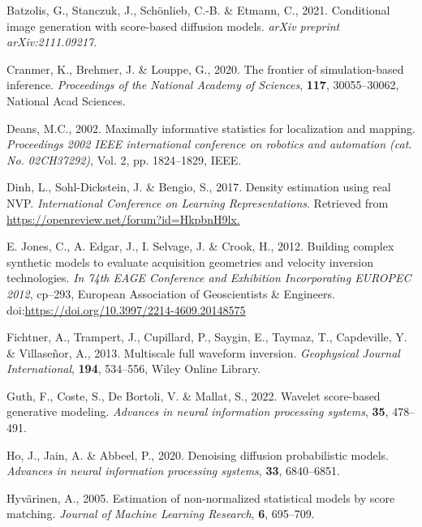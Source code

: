 \documentclass{IMAGE2025}
\begin{document}
\label{refs}
\begin{CSLReferences}{1}{0}
Batzolis, G., Stanczuk, J., Schönlieb, C.-B. \& Etmann, C., 2021.
Conditional image generation with score-based diffusion models.
\emph{arXiv preprint arXiv:2111.09217}.

Cranmer, K., Brehmer, J. \& Louppe, G., 2020. The frontier of
simulation-based inference. \emph{Proceedings of the National Academy of
Sciences}, \textbf{117}, 30055--30062, National Acad Sciences.

Deans, M.C., 2002. Maximally informative statistics for localization and
mapping. \emph{Proceedings 2002 IEEE international conference on
robotics and automation (cat. No. 02CH37292)}, Vol. 2, pp. 1824--1829,
IEEE.

Dinh, L., Sohl-Dickstein, J. \& Bengio, S., 2017. Density estimation
using real NVP. \emph{International Conference on Learning
Representations}. Retrieved from
\url{https://openreview.net/forum?id=HkpbnH9lx.}

E. Jones, C., A. Edgar, J., I. Selvage, J. \& Crook, H., 2012. Building
complex synthetic models to evaluate acquisition geometries and velocity
inversion technologies. \emph{In 74th EAGE Conference and Exhibition
Incorporating EUROPEC 2012}, cp--293, European Association of
Geoscientists \& Engineers.
doi:\url{https://doi.org/10.3997/2214-4609.20148575}

Fichtner, A., Trampert, J., Cupillard, P., Saygin, E., Taymaz, T.,
Capdeville, Y. \& Villaseñor, A., 2013. Multiscale full waveform
inversion. \emph{Geophysical Journal International}, \textbf{194},
534--556, Wiley Online Library.

Guth, F., Coste, S., De Bortoli, V. \& Mallat, S., 2022. Wavelet
score-based generative modeling. \emph{Advances in neural information
processing systems}, \textbf{35}, 478--491.

Ho, J., Jain, A. \& Abbeel, P., 2020. Denoising diffusion probabilistic
models. \emph{Advances in neural information processing systems},
\textbf{33}, 6840--6851.

Hyvärinen, A., 2005. Estimation of non-normalized statistical models by
score matching. \emph{Journal of Machine Learning Research}, \textbf{6},
695--709.


\end{CSLReferences}
\end{document}
